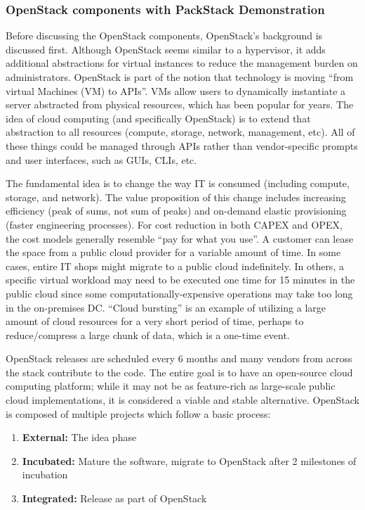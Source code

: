 \subsubsection{OpenStack components with PackStack Demonstration}
Before discussing the OpenStack components, OpenStack's background is
discussed first. Although OpenStack seems similar to a hypervisor, it adds
additional abstractions for virtual instances to reduce the management burden
on administrators. OpenStack is part of the notion that technology is moving
``from virtual Machines (VM) to APIs''. VMs allow users to dynamically
instantiate a server abstracted from physical resources, which has been
popular for years. The idea of cloud computing (and specifically OpenStack) is
to extend that abstraction to all resources (compute, storage, network,
management, etc). All of these things could be managed through APIs rather
than vendor-specific prompts and user interfaces, such as GUIs, CLIs, etc.

The fundamental idea is to change the way IT is consumed (including compute,
storage, and network). The value proposition of this change includes
increasing efficiency (peak of sums, not sum of peaks) and on-demand elastic
provisioning (faster engineering processes). For cost reduction in both CAPEX
and OPEX, the cost models generally resemble ``pay for what you use''. A
customer can lease the space from a public cloud provider for a variable
amount of time. In some cases, entire IT shops might migrate to a public cloud
indefinitely. In others, a specific virtual workload may need to be executed
one time for 15 minutes in the public cloud since some
computationally-expensive operations may take too long in the on-premises DC\@.
``Cloud bursting'' is an example of utilizing a large amount of cloud
resources for a very short period of time, perhaps to reduce/compress a large
chunk of data, which is a one-time event.

OpenStack releases are scheduled every 6 months and many vendors from across
the stack contribute to the code. The entire goal is to have an open-source
cloud computing platform; while it may not be as feature-rich as large-scale
public cloud implementations, it is considered a viable and stable
alternative. OpenStack is composed of multiple projects which follow a basic
process:

\begin{enumerate}
  \item	\textbf{External:} The idea phase
  \item	\textbf{Incubated:} Mature the software, migrate to OpenStack after 2
  milestones of incubation
  \item	\textbf{Integrated:} Release as part of OpenStack
\end{enumerate}

